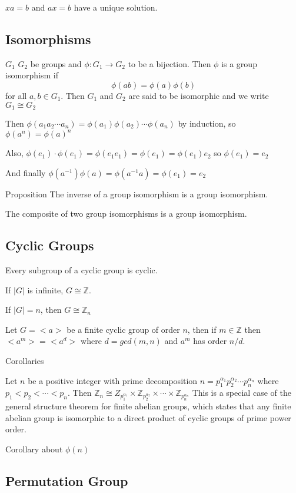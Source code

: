 \documentclass[12pt]{article}
\newcommand{\Z}{\mathbb{Z}}
\begin{document}
$xa = b$ and $ax = b$ have a unique solution.

\subsection{Isomorphisms}

$G_1$ $G_2$ be groups and $\phi : G_1 \to G_2$ to be a bijection. Then $\phi$ is a group isomorphism if $$\phi(ab) = \phi(a)\phi(b)$$ for all $a, b \in G_1$. Then $G_1$ and $G_2$ are said to be isomorphic and we write $G_1 \cong G_2$

Then $\phi(a_1a_2 \cdots a_n) = \phi(a_1)\phi(a_2) \cdots \phi(a_n)$ by induction, so $\phi(a^n) = \phi(a)^n$

Also, $\phi(e_1) \cdot \phi(e_1) = \phi(e_1e_1) = \phi(e_1) = \phi(e_1)e_2$ so $\phi(e_1) = e_2$

And finally $\phi(a^{-1}) \phi(a) = \phi(a^{-1}a) = \phi(e_1) = e_2$

Proposition The inverse of a group isomorphism is a group isomorphism.

The composite of two group isomorphisms is a group isomorphism.

\subsection{Cyclic Groups}

Every subgroup of a cyclic group is cyclic.

If $|G|$ is infinite, $G \cong \Z$.

If $|G| = n$, then $G \cong \Z_n$

Let $G = <a>$ be a finite cyclic group of order $n$, then if $m \in \Z$ then $<a^m> = <a^d>$ where $d = gcd(m, n)$ and $a^m$ has order $n/d$.

Corollaries

Let $n$ be a positive integer with prime decomposition $n = p_1^{\alpha_1}p_2^{\alpha_2}\cdots p_n^{\alpha_n}$ where $p_1 < p_2 < \cdots < p_n$. Then $\Z_n \cong Z_{p_1^{\alpha_1}} \times \Z_{p_2^{\alpha_2}} \times \cdots \times \Z_{p_n^{\alpha_n}}$ This is a special case of the general structure theorem for finite abelian groups, which states that any finite abelian group is isomorphic to a direct product of cyclic groups of prime power order.

Corollary about $\phi(n)$

\subsection{Permutation Group}
\end{document}

